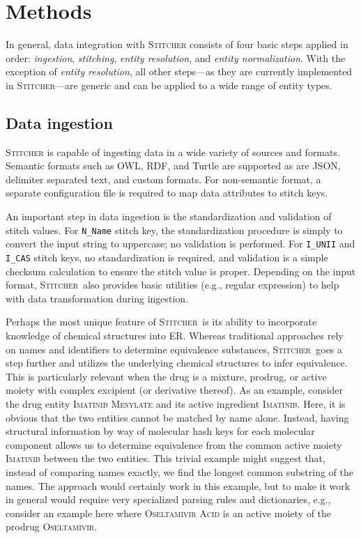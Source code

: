 \documentclass{bmcart}
\newcommand\st{\textsc{Stitcher}}
\begin{document}
\section*{Methods}\label{sec:methods}
In general, data integration with \st{} consists of four basic
steps applied in order: \emph{ingestion}, \emph{stitching},
\emph{entity resolution}, and \emph{entity normalization}. With
the exception of \emph{entity resolution}, all other steps---as they
are currently implemented in \st---are generic and can be applied to a
wide range of entity types.

\subsection*{Data ingestion}\label{sec:methods-ingest}
\st{} is capable of ingesting data in a wide variety of sources and
formats. Semantic formats such as OWL, RDF, and Turtle are supported
as are JSON, delimiter separated text, and custom formats. For
non-semantic format, a separate configuration file is required to map
data attributes to stitch keys. 

An important step in data ingestion is the standardization and
validation of stitch values. For \texttt{N\_Name} stitch key, the
standardization procedure is simply to convert the input string to
uppercase; no validation is performed. For \texttt{I\_UNII}
and \texttt{I\_CAS} stitch keys, no standardization is required, and
validation is a simple checksum calculation to ensure the stitch value
is proper. Depending on the input format, \st\ also provides basic
utilities (e.g., regular expression) to help with data transformation
during ingestion. 

Perhaps the most unique feature of \st\ is its ability to incorporate
knowledge of chemical structures into ER. Whereas
traditional approaches rely on names and identifiers to determine
equivalence substances, \st\ goes a step further and utilizes the
underlying chemical structures to infer equivalence. This 
is particularly relevant when the drug is a mixture, prodrug, or
active moiety with complex excipient (or derivative thereof). As an
example, consider the drug entity \textsc{Imatinib Mesylate} and its
active ingredient \textsc{Imatinib}. Here, it is obvious that the two
entities cannot be matched by name alone. Instead, having structural
information by way of molecular hash keys for each molecular component
allows us to determine equivalence from the common active
moiety \textsc{Imatinib} between the two entities. This trivial example
might suggest that, instead of comparing names exactly, we find the
longest common substring of the names. The approach would certainly
work in this example, but to make it work in general would require
very specialized parsing rules and dictionaries, e.g., consider an
example here where \textsc{Oseltamivir Acid} is an active moiety of
the prodrug \textsc{Oseltamivir}.
\end{document}
